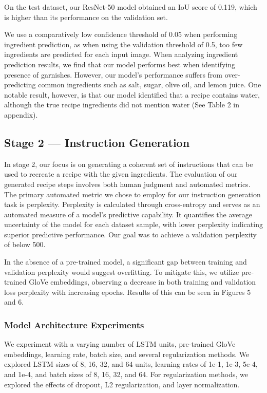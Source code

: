 \documentclass[10pt,twocolumn,letterpaper]{article}
\begin{document}
On the test dataset, our ResNet-50 model obtained an IoU score of 0.119, which is higher than its performance on the validation set.

We use a comparatively low confidence threshold of 0.05 when performing ingredient prediction, as when using the validation threshold of 0.5, too few ingredients are predicted for each input image. When analyzing ingredient prediction results, we find that our model performs best when identifying presence of garnishes. However, our model's performance suffers from over-predicting common ingredients such as salt, sugar, olive oil, and lemon juice. One notable result, however, is that our model identified that a recipe contains water, although the true recipe ingredients did not mention water (See Table 2 in appendix).

\subsection{Stage 2 --- Instruction Generation}
In stage 2, our focus is on generating a coherent set of instructions that can be used to recreate a recipe with the given ingredients. The evaluation of our generated recipe steps involves both human judgment and automated metrics. The primary automated metric we chose to employ for our instruction generation task is perplexity. Perplexity is calculated through cross-entropy and serves as an automated measure of a model's predictive capability. It quantifies the average uncertainty of the model for each dataset sample, with lower perplexity indicating superior predictive performance. Our goal was to achieve a validation perplexity of below 500.

In the absence of a pre-trained model, a significant gap between training and validation perplexity would suggest overfitting. To mitigate this, we utilize pre-trained GloVe embeddings, observing a decrease in both training and validation loss perplexity with increasing epochs. Results of this can be seen in Figures 5 and 6.

\subsubsection{Model Architecture Experiments}

We experiment with a varying number of LSTM units, pre-trained GloVe embeddings, learning rate, batch size, and several regularization methods. We explored LSTM sizes of 8, 16, 32, and 64 units, learning rates of 1e-1, 1e-3, 5e-4, and 1e-4, and batch sizes of 8, 16, 32, and 64. For regularization methods, we explored the effects of dropout, L2 regularization, and layer normalization.
\end{document}
